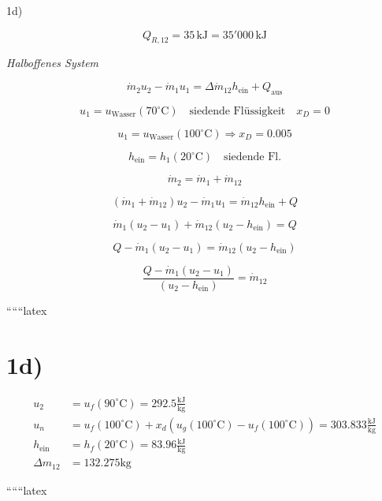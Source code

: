 1d)

\[
Q_{R,12} = 35 \, \text{kJ} = 35'000 \, \text{kJ}
\]

\textit{Halboffenes System}

\[
\dot{m}_2 u_2 - \dot{m}_1 u_1 = \Delta \dot{m}_{12} h_{\text{ein}} + Q_{\text{aus}}
\]

\[
u_1 = u_{\text{Wasser}} (70^\circ \text{C}) \quad \text{siedende Flüssigkeit} \quad x_D = 0
\]

\[
u_1 = u_{\text{Wasser}} (100^\circ \text{C}) \Rightarrow x_D = 0.005
\]

\[
h_{\text{ein}} = h_1 (20^\circ \text{C}) \quad \text{siedende Fl.}
\]

\[
\dot{m}_2 = \dot{m}_1 + \dot{m}_{12}
\]

\[
(\dot{m}_1 + \dot{m}_{12}) u_2 - \dot{m}_1 u_1 = \dot{m}_{12} h_{\text{ein}} + Q
\]

\[
\dot{m}_1 (u_2 - u_1) + \dot{m}_{12} (u_2 - h_{\text{ein}}) = Q
\]

\[
Q - \dot{m}_1 (u_2 - u_1) = \dot{m}_{12} (u_2 - h_{\text{ein}})
\]

\[
\frac{Q - \dot{m}_1 (u_2 - u_1)}{(u_2 - h_{\text{ein}})} = \dot{m}_{12}
\]

``````latex



\section*{1d)}

\begin{align*}
u_2 &= u_f(90^\circ \text{C}) = 292.5 \frac{\text{kJ}}{\text{kg}} \\
u_n &= u_f(100^\circ \text{C}) + x_d \left( u_g(100^\circ \text{C}) - u_f(100^\circ \text{C}) \right) = 303.833 \frac{\text{kJ}}{\text{kg}} \\
h_{\text{ein}} &= h_f(20^\circ \text{C}) = 83.96 \frac{\text{kJ}}{\text{kg}} \\
\Delta m_{12} &= 132.275 \text{kg}
\end{align*}

``````latex
